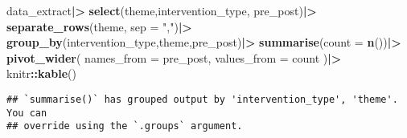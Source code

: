 \documentclass[
]{article}
\newenvironment{Shaded}{\begin{snugshade}}{\end{snugshade}}
\newcommand{\AttributeTok}[1]{\textcolor[rgb]{0.13,0.29,0.53}{#1}}
\newcommand{\FunctionTok}[1]{\textcolor[rgb]{0.13,0.29,0.53}{\textbf{#1}}}
\newcommand{\NormalTok}[1]{#1}
\newcommand{\SpecialCharTok}[1]{\textcolor[rgb]{0.81,0.36,0.00}{\textbf{#1}}}
\newcommand{\StringTok}[1]{\textcolor[rgb]{0.31,0.60,0.02}{#1}}
\begin{document}
\begin{Shaded}
\begin{Highlighting}[]
\NormalTok{data\_extract}\SpecialCharTok{|\textgreater{}}
  \FunctionTok{select}\NormalTok{(theme,intervention\_type, pre\_post)}\SpecialCharTok{|\textgreater{}}
  \FunctionTok{separate\_rows}\NormalTok{(theme, }\AttributeTok{sep =} \StringTok{","}\NormalTok{)}\SpecialCharTok{|\textgreater{}}
  \FunctionTok{group\_by}\NormalTok{(intervention\_type,theme,pre\_post)}\SpecialCharTok{|\textgreater{}}
  \FunctionTok{summarise}\NormalTok{(}\AttributeTok{count =} \FunctionTok{n}\NormalTok{())}\SpecialCharTok{|\textgreater{}}
  \FunctionTok{pivot\_wider}\NormalTok{(}
    \AttributeTok{names\_from =}\NormalTok{ pre\_post,}
    \AttributeTok{values\_from =}\NormalTok{ count}
\NormalTok{  )}\SpecialCharTok{|\textgreater{}}
\NormalTok{  knitr}\SpecialCharTok{::}\FunctionTok{kable}\NormalTok{()}
\end{Highlighting}
\end{Shaded}

\begin{verbatim}
## `summarise()` has grouped output by 'intervention_type', 'theme'. You can
## override using the `.groups` argument.
\end{verbatim}
\end{document}
